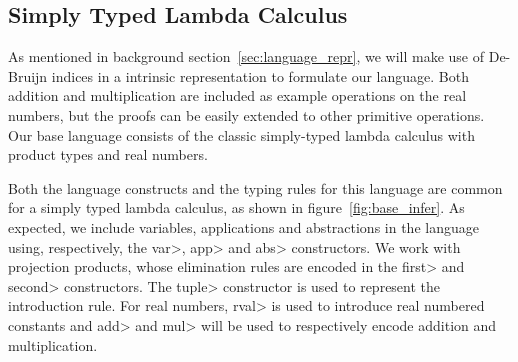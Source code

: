 \subsection{Simply Typed Lambda Calculus}\label{sec:formal_stlc}
  As mentioned in background section~\ref{sec:language_repr}, we will make use of De-Bruijn indices in a intrinsic representation to formulate our language.
  Both addition and multiplication are included as example operations on the real numbers, but the proofs can be easily extended to other primitive operations.
  Our base language consists of the classic simply-typed lambda calculus with product types and real numbers.

  Both the language constructs and the typing rules for this language are common for a simply typed lambda calculus, as shown in figure~\ref{fig:base_infer}.
  As expected, we include variables, applications and abstractions in the language using, respectively, the \<var>, \<app> and \<abs> constructors.
  We work with projection products, whose elimination rules are encoded in the  \<first> and \<second> constructors. The \<tuple> constructor is used to represent the introduction rule.
  For real numbers, \<rval> is used to introduce real numbered constants and \<add> and \<mul> will be used to respectively encode addition and multiplication.

